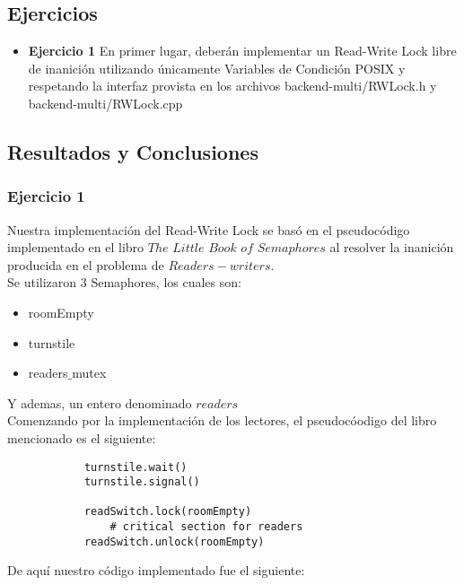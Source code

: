 
\subsection{Ejercicios}
\begin{itemize}
 \item \textbf{Ejercicio 1 }
 En primer lugar, deberán implementar un Read-Write Lock libre de inanición utilizando únicamente Variables de Condición POSIX 
 y  respetando la interfaz provista en los archivos backend-multi/RWLock.h y backend-multi/RWLock.cpp
\end{itemize}

\subsection{Resultados y Conclusiones}

\subsubsection[Resolución Ejercicio 1]{Ejercicio 1}

\indent Nuestra implementación del Read-Write Lock se bas\'{o} en el pseudoc\'{o}digo implementado en el libro $The$ $Little$ $Book$ $of$ $Semaphores$
al resolver la inanición producida en el problema de $Readers-writers$.\\

Se utilizaron 3 Semaphores, los cuales son:\\
\begin{itemize}
 \item roomEmpty
 \item turnstile
 \item readers$\_$mutex
\end{itemize}

Y ademas, un entero denominado $readers$\\

Comenzando por la implementación de los lectores, el pseudoc\'{o}odigo del libro mencionado es el siguiente:\\

\begin{verbatim}
            turnstile.wait()
            turnstile.signal()

            readSwitch.lock(roomEmpty)
                # critical section for readers
            readSwitch.unlock(roomEmpty)
\end{verbatim}

De aquí nuestro código implementado fue el siguiente:\\

